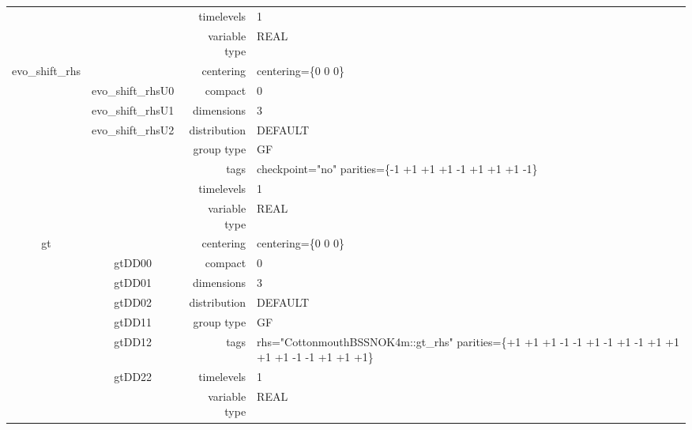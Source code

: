 \begin{tabular*}{150mm}{|c|c@{\extracolsep{\fill}}|rl|}
 &  & timelevels & 1 \\ 
 &  & variable type & REAL \\ 
\hline 
evo\_shift\_rhs &  & centering & centering=\{0 0 0\} \\ 
 & evo\_shift\_rhsU0 & compact & 0 \\ 
 & evo\_shift\_rhsU1 & dimensions & 3 \\ 
 & evo\_shift\_rhsU2 & distribution & DEFAULT \\ 
 &  & group type & GF \\ 
 &  & tags & checkpoint="no" parities=\{-1 +1 +1  +1 -1 +1  +1 +1 -1\} \\ 
 &  & timelevels & 1 \\ 
 &  & variable type & REAL \\ 
\hline 
gt &  & centering & centering=\{0 0 0\} \\ 
 & gtDD00 & compact & 0 \\ 
 & gtDD01 & dimensions & 3 \\ 
 & gtDD02 & distribution & DEFAULT \\ 
 & gtDD11 & group type & GF \\ 
 & gtDD12 & tags & rhs="CottonmouthBSSNOK4m::gt\_rhs" parities=\{+1 +1 +1  -1 -1 +1  -1 +1 -1  +1 +1 +1  +1 -1 -1  +1 +1 +1\} \\ 
 & gtDD22 & timelevels & 1 \\ 
 &  & variable type & REAL \\ 
\hline 
\end{tabular*} 



\vspace{5mm}
\vspace{5mm}

